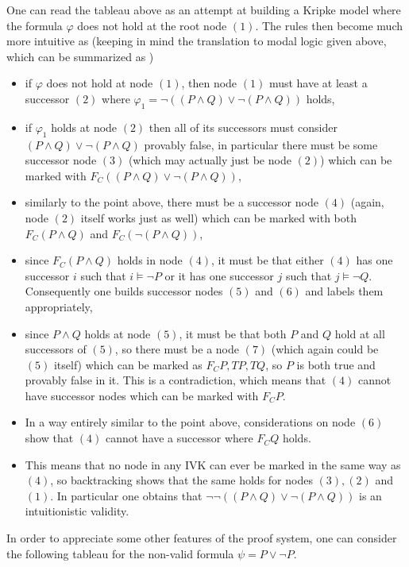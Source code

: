 One can read the tableau above as an attempt at building a Kripke model where the formula $\varphi$ does not hold at the root node $(1)$. The rules then become much more intuitive as (keeping in mind the translation to modal logic given above, which can be summarized as )
\begin{itemize}
    \item if $\varphi$ does not hold at node $(1)$, then node $(1)$ must have at least a successor $(2)$ where $\varphi_1= \neg ((P \land Q) \lor \neg (P \land Q))$ holds,
    \item if $\varphi_1$ holds at node $(2)$ then all of its successors must consider $(P \land Q) \lor \neg (P \land Q)$ provably false, in particular there must be some successor node $(3)$ (which may actually just be node $(2)$) which can be marked with $F_C((P \land Q) \lor \neg (P \land Q))$,
    \item similarly to the point above, there must be a successor node $(4)$ (again, node $(2)$ itself works just as well) which can be marked with both $F_C (P \land Q)$ and $F_C (\neg(P \land Q))$,
    \item since $F_C(P \land Q)$ holds in node $(4)$, it must be that either $(4)$ has one successor $i$ such that $i \vDash \neg P$ or it has one successor $j$ such that $j \vDash \neg Q$. Consequently one builds successor nodes $(5)$ and $(6)$ and labels them appropriately,
    \item since $P \land Q$ holds at node $(5)$, it must be that both $P$ and $Q$ hold at all successors of $(5)$, so there must be a node $(7)$ (which again could be $(5)$ itself) which can be marked as $F_C P, TP, TQ $, so $P$ is both true and provably false in it. This is a contradiction, which means that $(4)$ cannot have successor nodes which can be marked with $F_C P$.
    \item In a way entirely similar to the point above, considerations on node $(6)$ show that $(4)$ cannot have a successor where $F_C Q$ holds.
    \item This means that no node in any IVK can ever be marked in the same way as $(4)$, so backtracking shows that the same holds for nodes $(3),(2)$ and $(1)$. In particular one obtains that $\neg \neg ((P \land Q) \lor \neg (P \land Q))$ is an intuitionistic validity.
\end{itemize}

In order to appreciate some other features of the proof system, one can consider the following tableau for the non-valid formula $\psi = P \lor \neg P$.

